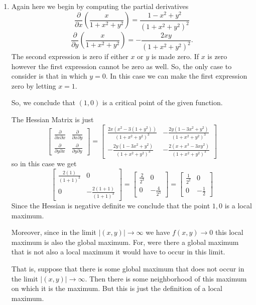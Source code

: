 \documentclass[12pt]{article}
\begin{document}
\begin{enumerate}
\item Again here we begin by computing the partial derivatives
\[\frac{\partial}{\partial x} \left( \frac{x}{1+x^2+y^2} \right) = \frac{1-x^2+y^2}{\left(1+x^2+y^2\right)^2} \]
\[\frac{\partial}{\partial y} \left( \frac{x}{1+x^2+y^2} \right) = -\frac{2 x y}{\left(1+x^2+y^2\right)^2} .\]
The second expression is zero if either $x$ or $y$ is made zero. If $x$ is zero however the first expression cannot be zero as well. So, the only case to consider is that in which $y=0$. In this case we can make the first expression zero by letting $x=1$.

So, we conclude that $(1,0)$ is a critical point of the given function.

The Hessian Matrix is just
\[\left[ \begin{array} {lr} \frac{\partial }{\partial x\partial x} & \frac{\partial }{\partial x\partial y} \\
\frac{\partial }{\partial y \partial x} &\frac{\partial }{\partial y\partial y}  \end{array} \right] 
=
\left[ \begin{array} {lr}\frac{2 x \left(x^2-3 \left(1+y^2\right)\right)}{\left(1+x^2+y^2\right)^3}& -\frac{2 y \left(1-3 x^2+y^2\right)}{\left(1+x^2+y^2\right)^3} \\
-\frac{2 y \left(1-3 x^2+y^2\right)}{\left(1+x^2+y^2\right)^3}&-\frac{2 \left(x+x^3-3 x y^2\right)}{\left(1+x^2+y^2\right)^3} \end{array} \right] 
\]
so in this case we get
\[
\left[ \begin{array} {lr}\frac{2  \left(1 \right)}{\left(1+1\right)^3}& 0\\
0&-\frac{2 \left(1+1\right)}{\left(1+1\right)^3} \end{array} \right] 
=
\left[ \begin{array} {lr}\frac{2}{2^3}& 0\\
0&-\frac{4}{2^3} \end{array} \right] 
=
\left[ \begin{array} {lr}\frac{1}{2^2}& 0\\
0&-\frac{1}{2} \end{array} \right] 
\]
Since the Hessian is negative definite we conclude that the point ${1,0}$ is a local maximum.

Moreover, since in the limit $|(x,y)| \to \infty$ we have $f(x,y) \to 0$ this local maximum is also the global maximum. For, were there a global maximum that is not also a local maximum it would have to occur in this limit.

That is, suppose that there is some global maximum that does not occur in the limit  $|(x,y)| \to \infty$. Then there is some neighborhood of this maximum on which it is the maximum. But this is just the definition of a local maximum.
\end{enumerate}
\end{document}
